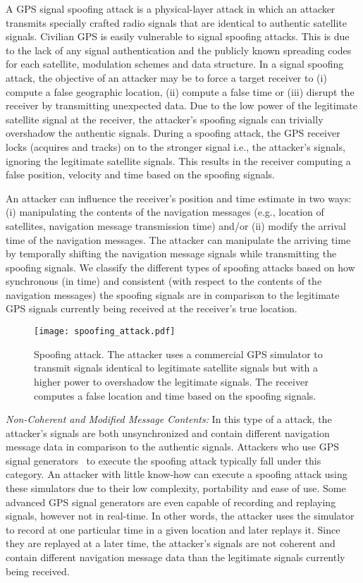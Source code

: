\documentclass[letterpaper,twocolumn,10pt]{article}
\newcommand{\eg}{e.g.,\xspace}
\newcommand{\ie}{i.e.,\xspace}
\begin{document}
A GPS signal spoofing attack is a physical-layer attack in which an attacker transmits specially crafted radio signals that are identical to authentic satellite signals. Civilian GPS is easily vulnerable to signal spoofing attacks. This is due to the lack of any signal authentication and the publicly known spreading codes for each satellite, modulation schemes and data structure. In a signal spoofing attack, the objective of an attacker may be to force a target receiver to (i) compute a false geographic location, (ii) compute a false time or (iii) disrupt the receiver by transmitting unexpected data. Due to the low power of the legitimate satellite signal at the receiver, the attacker's spoofing signals can trivially overshadow the authentic signals. During a spoofing attack, the GPS receiver locks (acquires and tracks) on to the stronger signal \ie the attacker's signals, ignoring the legitimate satellite signals. This results in the receiver computing a false position, velocity and time based on the spoofing signals. 

An attacker can influence the receiver's position and time estimate in two ways: (i) manipulating the contents of the navigation messages (\eg location of satellites, navigation message transmission time) and/or (ii) modify the arrival time of the navigation messages. The attacker can manipulate the arriving time by temporally shifting the navigation message signals while transmitting the spoofing signals. We classify the different types of spoofing attacks based on how synchronous (in time) and consistent (with respect to the contents of the navigation messages) the spoofing signals are in comparison to the legitimate GPS signals currently being received at the receiver's true location.\\ 
\begin{figure}[t]
  \centering
  \texttt{[image: spoofing\_attack.pdf]}
  \caption{Spoofing attack. The attacker uses a commercial GPS simulator to transmit signals identical to legitimate satellite signals but with a higher power to overshadow the legitimate signals. The receiver computes a false location and time based on the spoofing signals.}
  \label{fig:spoofing-attack}
\end{figure}


\noindent\textit{Non-Coherent and Modified Message Contents:} In this type of a attack, the attacker's signals are both unsynchronized and contain different navigation message data in comparison to the authentic signals. Attackers who use GPS signal generators~\cite{spectracom,labsat} to execute the spoofing attack typically fall under this category. An attacker with little know-how can execute a spoofing attack using these simulators due to their low complexity, portability and ease of use. Some advanced GPS signal generators are even capable of recording and replaying signals, however not in real-time. In other words, the attacker uses the simulator to record at one particular time in a given location and later replays it. Since they are replayed at a later time, the attacker's signals are not coherent and contain different navigation message data than the legitimate signals currently being received.\\
\end{document}
